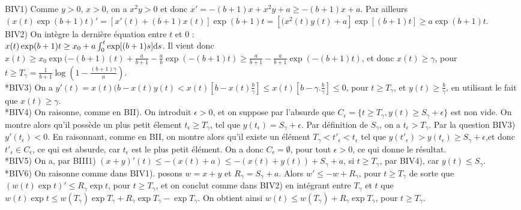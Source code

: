 \documentclass[11pt]{article}
\def \rd    {{\rm d}}
\theoremstyle{exostyle}
\begin{document}
\smallskip
\noindent
BIV1) Comme $y>0$, $x>0$, on a  $x^2y>0$  et  donc   $x'=-(b+1)x+x^2y+a \geq -(b+1)x+a$.  Par ailleurs
$(x(t)\exp(b+1)t)'=[x'(t)+(b+1)x(t)] \exp(b+1)t=[(x^2(t)y(t)+a] \exp [(b+1)t]\geq a \exp(b+1)t$. \\
BIV2) On int\`egre la derni\`ere \'equation entre  $t$ et $0$ : \\
$x(t)\exp (b+1)t\geq x_0+ a\int_0^t \exp[(b+1)s]\rd s$. Il vient donc \\
$x(t)\geq     x_0\exp(-(b+1) (t)+ \frac{a}{b+1}- \frac{a}{b}\exp (-(b+1)t)\geq \frac{a}{b+1}- \frac{a}{b+1}\exp (-(b+1)t)$, et donc 
$x(t)\geq \gamma$, pour $t \geq T_\gamma= \frac{1}{b+1}\log(1-\frac{(b+1)\gamma}{a})$. \\
*BIV3)  On a $y'(t)=x(t)(b-x(t)y(t)<x(t)[b-x(t)\frac{b}{\gamma}] \leq x(t)[b-\gamma. \frac{b}{\gamma}] \leq 0$, pour $t \geq T_\gamma$, et $y(t)\geq \frac{b}{\gamma}$, en utilisant le fait que $x(t)\geq \gamma$. \\
*BIV4)   On raisonne, comme en BII). On  introduit $\epsilon>0$, et  on suppose par l'absurde que $C_\epsilon=\{t\geq T_\gamma, y(t)\geq  S_\gamma+ \epsilon\}$ est non vide.   On montre alors  qu'il poss\`ede un plus petit \'element $t_\epsilon \geq T_\gamma$, tel que $y(t_\epsilon)=S_\gamma+ \epsilon$. Par d\'efinition de $S_\gamma$, on a $t_\epsilon>T_\gamma$. Par la question BIV3) $y'(t_\epsilon)<0$. En raisonnant, comme en BII, on montre alors qu'il existe un \'el\'ement  $T_\gamma<t'_\epsilon<t_\epsilon$  tel que $y(t'_\epsilon) >y(t_\epsilon) \geq  S_\gamma+\epsilon$,et donc
$t'_\epsilon \in C_\epsilon$, ce qui est absurde, car $t_\epsilon$ est le plus petit \'el\'ement.  On a donc $C_\epsilon=\emptyset$, pour tout $\epsilon >0$, ce qui donne le r\'esultat. \\
*BIV5) On a, par BIII1) $(x+y)'(t)\leq -(x(t)+a)\leq -(x(t)+y(t))+S_\gamma+a $, si $t\geq T_\gamma$, par BIV4), car $y(t)\leq S_\gamma$. \\
*BIV6) On raisonne comme dans BIV1). posons $w=x+y$ et $R_\gamma=S_\gamma+a$. Alors $w'\leq -w+R_\gamma$,  pour $t\geq T_\gamma$ de sorte que
   $(w(t)\exp t)'\leq R_\gamma \exp t$,  pour $t\geq T_\gamma$,  et on conclut comme dans BIV2)  en int\'egrant entre $T_\gamma$  et $t$ que 
   $w(t)\exp t \leq w(T_\gamma) \exp T_\gamma+ R_\gamma \exp T_\gamma-\exp T_\gamma$. On obtient ainsi  
   $w(t) \leq  w(T_\gamma)+ R_\gamma\exp  T_\gamma$, pour $t \geq T_\gamma$. 
   
\end{document}
